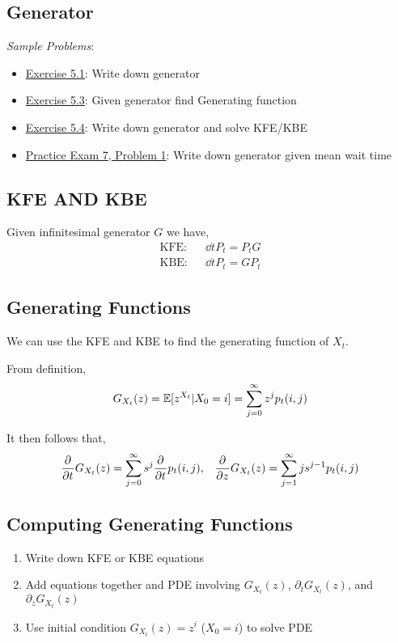 \documentclass[12pt]{article}
\begin{document}
\subsection{Generator}
\textit{Sample Problems}: 
\begin{itemize}[nolistsep]
    \item \hyperref[Exercise 5.1]{Exercise 5.1}: Write down generator
    \item \hyperref[Exercise 5.3]{Exercise 5.3}: Given generator find Generating function
    \item \hyperref[Exercise 5.4]{Exercise 5.4}: Write down generator and solve KFE/KBE
    \item \hyperref[Practice Exam 7, Problem 1]{Practice Exam 7, Problem 1}: Write down generator given mean wait time
\end{itemize}

\subsection{KFE AND KBE}
Given infinitesimal generator \( G \) we have,
\begin{align*}
    \text{KFE}: && \dd{}{t}P_t = P_t G \\
    \text{KBE}: && \dd{}{t}P_t = GP_t
\end{align*}

\subsection{Generating Functions}
We can use the KFE and KBE to find the generating function of \( X_t \).

From definition,
\begin{align*}
    G_{X_t}(z) = \mathbb{E}[z^{X_t} | X_0 = i] = \sum_{j=0}^{\infty} z^j p_t(i,j)
\end{align*}

It then follows that,
\begin{align*}
    \frac{\partial^{}}{\partial t^{}}G_{X_t}(z) = \sum_{j=0}^{\infty} s^j  \frac{\partial^{}}{\partial t^{}} p_{t}(i,j) 
    ,&&
    \frac{\partial^{}}{\partial z^{}}G_{X_t}(z) = \sum_{j=1}^{\infty} js^{j-1}p_t(i,j)
\end{align*}

\subsection{Computing Generating Functions}
\begin{enumerate}[nolistsep]
    \item Write down KFE or KBE equations
    \item Add equations together and PDE involving \( G_{X_t}(z) \), \( \partial_t G_{X_t}(z) \), and \( \partial_z G_{X_t}(z) \)
    \item Use initial condition \( G_{X_t}(z) = z^i \) (\(X_0 = i \)) to solve PDE
\end{enumerate}
\end{document}

